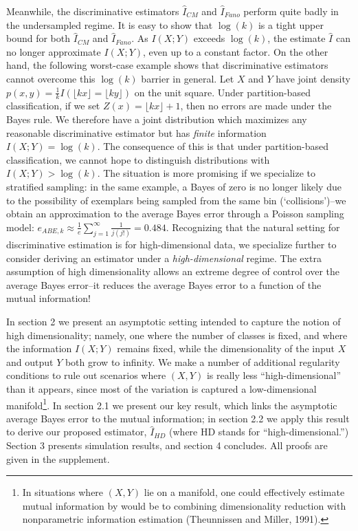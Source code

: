 \documentclass{article}
\begin{document}
Meanwhile, the discriminative estimators $\hat{I}_{CM}$ and $\hat{I}_{Fano}$ perform quite badly in the undersampled regime.  It is easy to show that $\log(k)$ is a tight upper bound for both $\hat{I}_{CM}$ and 
$\hat{I}_{Fano}$.  As $I(X; Y)$ exceeds $\log(k)$, the estimate $\hat{I}$ can no longer approximate $I(X; Y)$, even up to a constant factor.  On the other hand, the following worst-case example shows that discriminative estimators cannot overcome this $\log(k)$ barrier in general.  Let $X$ and $Y$ have joint density
$
p(x, y) = \frac{1}{k}I(\lfloor kx \rfloor = \lfloor ky \rfloor)
$ on the unit square.  Under partition-based classification, if we set $Z(x) = \lfloor kx \rfloor + 1$,
then no errors are made under the Bayes rule. We therefore have a joint distribution which maximizes any reasonable discriminative estimator but has \emph{finite} information $I(X; Y) = \log(k)$.
The consequence of this is that under partition-based classification,
we cannot hope to distinguish distributions with $I(X; Y) > \log(k)$.
The situation is more promising if we specialize to stratified sampling: in the same example, a Bayes of zero is no longer likely due to the possibility of exemplars being sampled from the same bin (`collisions')--we obtain an approximation to the average Bayes error through a Poisson sampling model: $e_{ABE, k} \approx \frac{1}{e}\sum_{j=1}^\infty \frac{1}{j(j!)}= 0.484$.
Recognizing that the natural setting for discriminative estimation is for high-dimensional data,
we specialize further to consider deriving an estimator under a \emph{high-dimensional} regime.
The extra assumption of high dimensionality allows an extreme degree of control over the average Bayes error--it reduces the average Bayes error to a function of the mutual information!

In section 2 we present an asymptotic
setting intended to capture the notion of high dimensionality; namely,
one where the number of classes is fixed, and where the information
$I(X; Y)$ remains fixed, while the dimensionality of the input $X$ and
output $Y$ both grow to infinity.  
We make a number of additional
regularity conditions to rule out scenarios where $(X, Y)$ is really
less ``high-dimensional'' than it appears, since most of the variation
is captured a low-dimensional manifold\footnote{In situations where $(X, Y)$ lie on a manifold, one could effectively estimate mutual information by would be to combining dimensionality reduction with nonparametric information estimation (Theunnissen and Miller, 1991). }.  In section 2.1 we present our
key result, which links the asymptotic average Bayes error to the
mutual information; in section 2.2 we apply this result to derive our
proposed estimator, $\hat{I}_{HD}$ (where HD stands for ``high-dimensional.'')  Section 3 presents
simulation results, and section 4 concludes.  All proofs are given in the supplement.
\end{document}
